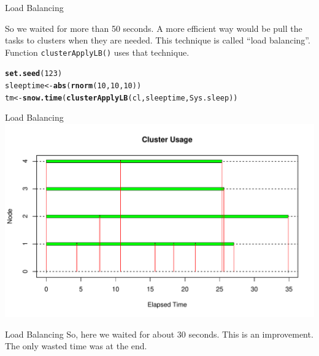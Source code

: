 \documentclass[aspectratio=169]{beamer}\usepackage[]{graphicx}\usepackage[]{color}
\makeatletter
\newcommand{\hlnum}[1]{\textcolor[rgb]{0.686,0.059,0.569}{#1}}%
\newcommand{\hlstd}[1]{\textcolor[rgb]{0.345,0.345,0.345}{#1}}%
\newcommand{\hlkwb}[1]{\textcolor[rgb]{0.69,0.353,0.396}{#1}}%
\newcommand{\hlkwd}[1]{\textcolor[rgb]{0.737,0.353,0.396}{\textbf{#1}}}%
\newenvironment{kframe}{%
 \def\at@end@of@kframe{}%
 \ifinner\ifhmode%
  \def\at@end@of@kframe{\end{minipage}}%
  \begin{minipage}{\columnwidth}%
 \fi\fi%
 \def\FrameCommand##1{\hskip\@totalleftmargin \hskip-\fboxsep
 \colorbox{shadecolor}{##1}\hskip-\fboxsep
     \hskip-\linewidth \hskip-\@totalleftmargin \hskip\columnwidth}%
 \MakeFramed {\advance\hsize-\width
   \@totalleftmargin\z@ \linewidth\hsize
   \@setminipage}}%
 {\par\unskip\endMakeFramed%
 \at@end@of@kframe}
\newenvironment{knitrout}{}{} %
\makeatother
\begin{document}
\begin{frame}[fragile]{Load Balancing}

So we waited for more than 50 seconds. 
A more efficient way would be pull the tasks to clusters when they are needed.
This technique is called {\color{blue} ``load balancing''}. Function \texttt{clusterApplyLB()} uses that technique.


\begin{knitrout}\scriptsize
{}\color{fgcolor}\begin{kframe}
\begin{alltt}
\hlkwd{set.seed}\hlstd{(}\hlnum{123}\hlstd{)}
\hlstd{sleeptime} \hlkwb{<-} \hlkwd{abs}\hlstd{(}\hlkwd{rnorm}\hlstd{(}\hlnum{10}\hlstd{,} \hlnum{10}\hlstd{,} \hlnum{10}\hlstd{))}
\hlstd{tm} \hlkwb{<-} \hlkwd{snow.time}\hlstd{(}\hlkwd{clusterApplyLB}\hlstd{(cl, sleeptime, Sys.sleep))}
\end{alltt}
\end{kframe}
\end{knitrout}
\end{frame}

\begin{frame}[fragile]{Load Balancing}
\begin{knitrout}\tiny
{}\color{fgcolor}
\includegraphics[width=.89\linewidth]{figure/unnamed-chunk-12-1} 

\end{knitrout}
\end{frame}

\begin{frame}{Load Balancing}
  So, here we waited for about 30 seconds. This is an improvement. The only wasted time was at the end. 
\end{frame}
\end{document}
